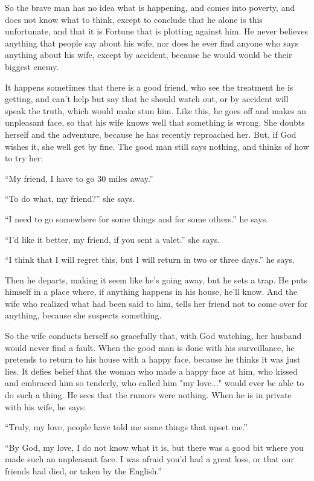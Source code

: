 \documentclass{book}
\begin{document}
So the brave man has no idea what is happening, and comes into poverty, and does not know what to think, except to conclude that he alone is this unfortunate, and that it is Fortune that is plotting against him. He never believes anything that people say about his wife, nor does he ever find anyone who says anything about his wife, except by accident, because he would would be their biggest enemy. 

It happens sometimes that there is a good friend, who see the treatment he is getting, and can't help but say that he should watch out, or by accident will speak the truth, which would make stun him. Like this, he goes off and makes an unpleasant face, so that his wife knows well that something is wrong. She doubts herself and the adventure, because he has recently reproached her. But, if God wishes it, she well get by fine. The good man still says nothing, and thinks of how to try her:

``My friend, I have to go 30 miles away.''

``To do what, my friend?'' she says.

``I need to go somewhere for some things and for some others.'' he says. 

``I'd like it better, my friend, if you sent a valet.'' she says.

``I think that I will regret this, but I will return in two or three days.'' he says.

Then he departs, making it seem like he's going away, but he sets a trap. He puts himself in a place where, if anything happens in his house, he'll know. And the wife who realized what had been said to him, tells her friend not to come over for anything, because she suspects something.

So the wife conducts herself so gracefully that, with God watching, her husband would never find a fault. When the good man is done with his surveillance, he pretends to return to his house with a happy face, because he thinks it was just lies. It defies belief that the woman who made a happy face at him, who kissed and embraced him so tenderly, who called him "my love..." would ever be able to do such a thing. He sees that the rumors were nothing. When he is in private with his wife, he says:

``Truly, my love, people have told me some things that upset me.''

``By God, my love, I do not know what it is, but there was a good bit where you made such an unpleasant face. I was afraid you'd had a great loss, or that our friends had died, or taken by the English.''
\end{document}
